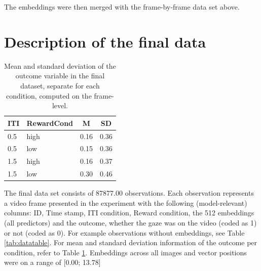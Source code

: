 \documentclass[
  man]{apa6}
\begin{document}
The embeddings were then merged with the frame-by-frame data set above.

\hypertarget{description-of-the-final-data}{%
\section{Description of the final data}\label{description-of-the-final-data}}

\begin{table}[tbp]

\begin{center}
\begin{threeparttable}

\caption{\label{tab:descriptives}Mean and standard deviation of the outcome variable in the final dataset, separate for each condition, computed on the frame-level.}

\begin{tabular}{llll}
\toprule
ITI & \multicolumn{1}{c}{RewardCond} & \multicolumn{1}{c}{M} & \multicolumn{1}{c}{SD}\\
\midrule
0.5 & high & 0.16 & 0.36\\
0.5 & low & 0.15 & 0.36\\
1.5 & high & 0.16 & 0.37\\
1.5 & low & 0.30 & 0.46\\
\bottomrule
\end{tabular}

\end{threeparttable}
\end{center}

\end{table}

The final data set consists of 87877.00 observations. Each observation represents a video frame presented in the experiment with the following (model-relevant) columns: ID, Time stamp, ITI condition, Reward condition, the 512 embeddings (all predictors) and the outcome, whether the gaze was on the video (coded as 1) or not (coded as 0). For example observations without embeddings, see Table \ref{tab:datatable}. For mean and standard deviation information of the outcome per condition, refer to Table \ref{tab:descriptives}. Embeddings across all images and vector positions were on a range of {[}0.00; 13.78{]}
\end{document}
